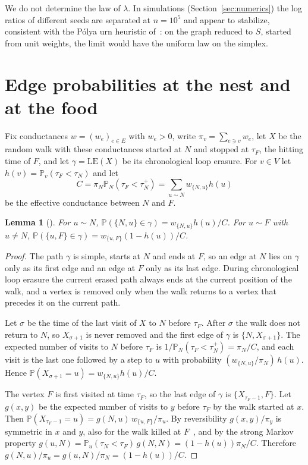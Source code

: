 \documentclass[11pt]{amsart}
\newtheorem{lemma}[theorem]{Lemma}
\theoremstyle{remark}
\newcommand{\Prob}{\mathbb{P}}
\begin{document}
We do not determine the law of $\lambda$. In simulations (Section~\ref{sec:numerics}) the log ratios of different
seeds are separated at $n=10^5$ and appear to stabilize, consistent with the P\'olya urn heuristic of~\cite{AM}: on the graph reduced to $S$, started
from unit weights, the
limit would have the uniform law on the simplex.

\section{Edge probabilities at the nest and at the food}\label{sec:edges}

Fix conductances $w=(w_e)_{e\in E}$ with $w_e>0$, write $\pi_v=\sum_{e\ni v}w_e$, let $X$ be the random walk with these
conductances started at $N$ and stopped at $\tau_F$, the hitting time of $F$, and let $\gamma=\mathrm{LE}(X)$ be its
chronological loop erasure. For $v\in V$ let $h(v)=\Prob_v(\tau_F<\tau_N)$ and let
\[
C=\pi_N\Prob_N(\tau_F<\tau_N^+)=\sum_{u\sim N}w_{\{N,u\}}h(u)
\]
be the effective conductance between $N$ and $F$.

\begin{lemma}[{\cite[Lemmas~2.12 and~2.13]{AM}}]\label{lem:edges}
For $u\sim N$, $\Prob(\{N,u\}\in\gamma)=w_{\{N,u\}}h(u)/C$. For $u\sim F$ with $u\ne N$,
$\Prob(\{u,F\}\in\gamma)=w_{\{u,F\}}(1-h(u))/C$.
\end{lemma}

\begin{proof}
The path $\gamma$ is simple, starts at $N$ and ends at $F$, so an edge at $N$ lies on $\gamma$ only as its first edge
and an edge at $F$ only as its last edge. During chronological loop erasure the current erased path always ends at the
current position of the walk, and a vertex is removed only when the walk returns to a vertex that precedes it on the
current path.

Let $\sigma$ be the time of the last visit of $X$ to $N$ before $\tau_F$. After $\sigma$ the walk does not return to $N$,
so $X_{\sigma+1}$ is never removed and the first edge of $\gamma$ is $\{N,X_{\sigma+1}\}$. The expected number of visits
to $N$ before $\tau_F$ is $1/\Prob_N(\tau_F<\tau_N^+)=\pi_N/C$, and each visit is the last one followed by a step to $u$
with probability $(w_{\{N,u\}}/\pi_N)\,h(u)$. Hence $\Prob(X_{\sigma+1}=u)=w_{\{N,u\}}h(u)/C$.

The vertex $F$ is first visited at time $\tau_F$, so the last edge of $\gamma$ is $\{X_{\tau_F-1},F\}$. Let $g(x,y)$ be
the expected number of visits to $y$ before $\tau_F$ by the walk started at $x$. Then
$\Prob(X_{\tau_F-1}=u)=g(N,u)\,w_{\{u,F\}}/\pi_u$. By reversibility $g(x,y)/\pi_y$ is symmetric in $x$ and
$y$, also for the walk killed at $F$~\cite[Exercise~2.1(e) and the proof of Proposition~2.1]{LP17}, and by the strong Markov property $g(u,N)=\Prob_u(\tau_N<\tau_F)\,g(N,N)=(1-h(u))\pi_N/C$.
Therefore $g(N,u)/\pi_u=g(u,N)/\pi_N=(1-h(u))/C$.
\end{proof}
\end{document}
